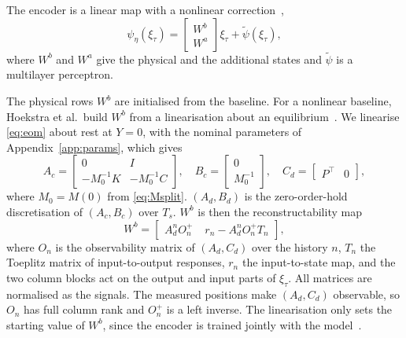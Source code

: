 The encoder is a linear map with a nonlinear
correction~\cite[Eq.~(8)]{hoekstra2026encoder},
\begin{equation}
 \psi_\eta(\xi_\tau)
 =\begin{bmatrix}W^b\\ W^a\end{bmatrix}\xi_\tau+\tilde\psi(\xi_\tau),
 \label{eq:aug_enc_lin}
\end{equation}
where $W^b$ and $W^a$ give the physical and the additional states and
$\tilde\psi$ is a multilayer perceptron.

The physical rows $W^b$ are initialised from the baseline.
For a nonlinear baseline, Hoekstra et al.\ build $W^b$ from a linearisation
about an equilibrium~\cite[Eqs.~(30), (31)]{hoekstra2026encoder}.
We linearise \eqref{eq:eom} about rest at $Y=0$, with the nominal parameters
of Appendix~\ref{app:params}, which gives
\begin{equation}
 A_c=\begin{bmatrix}0 & I\\ -M_0^{-1}K & -M_0^{-1}C\end{bmatrix},\quad
 B_c=\begin{bmatrix}0\\ M_0^{-1}\end{bmatrix},\quad
 C_d=\begin{bmatrix}P^\top & 0\end{bmatrix},
 \label{eq:aug_lin}
\end{equation}
where $M_0=M(0)$ from \eqref{eq:Msplit}.
$(A_d,B_d)$ is the zero-order-hold discretisation of $(A_c,B_c)$ over $T_s$.
$W^b$ is then the reconstructability
map~\cite[Eqs.~(16), (17)]{hoekstra2026encoder}
\begin{equation}
 W^b=\begin{bmatrix}
  A_d^nO_n^{+} & \;r_n-A_d^nO_n^{+}T_n
 \end{bmatrix},
 \label{eq:aug_wb}
\end{equation}
where $O_n$ is the observability matrix of $(A_d,C_d)$ over the history $n$,
$T_n$ the Toeplitz matrix of input-to-output responses, $r_n$ the
input-to-state map, and the two column blocks act on the output and input
parts of $\xi_\tau$.
All matrices are normalised as the signals.
The measured positions make $(A_d,C_d)$ observable, so $O_n$ has full column
rank and $O_n^{+}$ is a left inverse.
The linearisation only sets the starting value of $W^b$, since the encoder
is trained jointly with the model~\cite[Sec.~3.1]{hoekstra2026encoder}.

